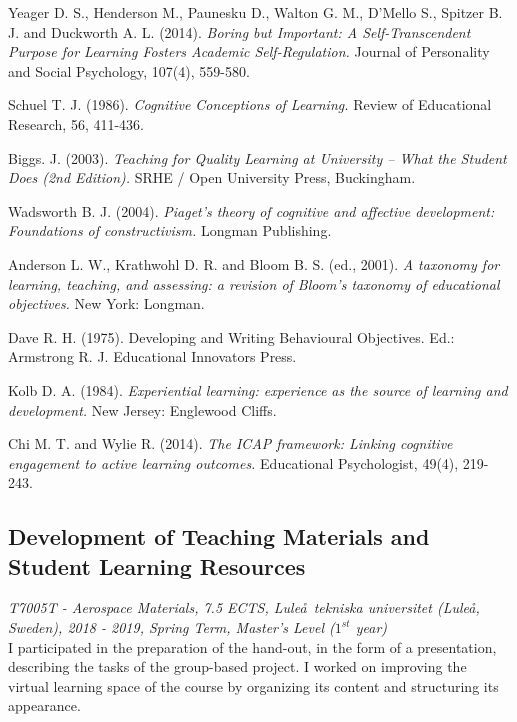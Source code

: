 \documentclass[
  a4paper, 
]{fortysecondscv}
\begin{document}
\begin{thebibliography}{9}
Yeager D. S., Henderson M., Paunesku D., Walton G. M., D’Mello S., Spitzer B. J. and Duckworth A. L. (2014).
\textit{Boring but Important: A Self-Transcendent Purpose for Learning Fosters Academic Self-Regulation.}
Journal of Personality and Social Psychology, 107(4), 559-580.

Schuel T. J. (1986).
\textit{Cognitive Conceptions of Learning.}
Review of Educational Research, 56, 411-436.

Biggs. J. (2003).
\textit{Teaching for Quality Learning at University – What the Student Does (2nd Edition).}
SRHE / Open University Press, Buckingham.

Wadsworth B. J. (2004).
\textit{Piaget's theory of cognitive and affective development: Foundations of constructivism.}
Longman Publishing.

Anderson L. W., Krathwohl D. R. and Bloom B. S. (ed., 2001).
\textit{A taxonomy for learning, teaching, and assessing: a revision of Bloom’s taxonomy of educational objectives.}
New York: Longman.

Dave R. H. (1975). Developing and Writing Behavioural Objectives. Ed.:  Armstrong R. J. Educational Innovators Press.

Kolb D. A. (1984).
\textit{Experiential learning: experience as the source of learning and development.}
New Jersey: Englewood Cliffs.

Chi M. T. and Wylie R. (2014).
\textit{The ICAP framework: Linking cognitive engagement to active learning outcomes.}
Educational Psychologist, 49(4), 219-243.

\end{thebibliography}

\newpage
\makebacksidebar
\hrulefill\hspace{5pt}\textbf{\thepage}

\subsection{Development of Teaching Materials and Student Learning Resources}
\textit{T7005T - Aerospace Materials, 7.5 ECTS, Lule\aa\ tekniska universitet (Lule\aa, Sweden), 2018 - 2019, Spring Term, Master's Level ($1^{st}$ year)}\\
I participated in the preparation of the hand-out, in the form of a presentation, describing the tasks of the group-based project. I worked on improving the virtual learning space of the course by organizing its content and structuring its appearance.
\end{document}
